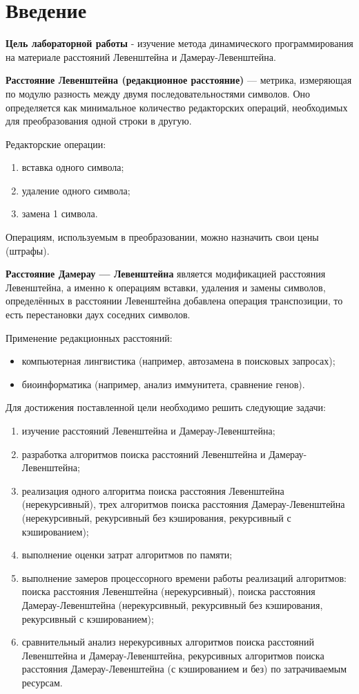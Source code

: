 \chapter*{Введение}
\textbf{Цель лабораторной работы} - изучение метода динамического программирования на материале расстояний Левенштейна и Дамерау-Левенштейна.

\textbf{Расстояние Левенштейна (редакционное расстояние)} — метрика, измеряющая по модулю разность между двумя последовательностями символов. Оно определяется как минимальное количество редакторских операций, необходимых для преобразования одной строки в другую.

Редакторские операции:
\begin{enumerate}[label={\arabic*)}]
    \item вставка одного символа;
    \item удаление одного символа;
    \item замена 1 символа.
\end{enumerate}

Операциям, используемым в преобразовании, можно назначить свои цены (штрафы).

\textbf{Расстояние Дамерау — Левенштейна} является модификацией расстояния Левенштейна, а именно к операциям вставки, удаления и замены символов, определённых в расстоянии Левенштейна добавлена операция транспозиции, то есть перестановки даух соседних символов.

Применение редакционных расстояний:
\begin{itemize}
	\item компьютерная лингвистика (например, автозамена в поисковых запросах);
	\item биоинформатика (например, анализ иммунитета, сравнение генов).
\end{itemize}

Для достижения поставленной цели необходимо решить следующие задачи:
\begin{enumerate}[label={\arabic*)}]
	\item изучение расстояний Левенштейна и Дамерау-Левенштейна;
	\item разработка алгоритмов поиска расстояний Левенштейна и Дамерау-Левенштейна;
	\item реализация одного алгоритма поиска расстояния Левенштейна (нерекурсивный), трех алгоритмов поиска расстояния Дамерау-Левенштейна (нерекурсивный, рекурсивный без кэширования, рекурсивный с кэшированием);
	\item выполнение оценки затрат алгоритмов по памяти;
	\item выполнение замеров процессорного времени работы реализаций алгоритмов:  поиска расстояния Левенштейна (нерекурсивный), поиска расстояния Дамерау-Левенштейна (нерекурсивный, рекурсивный без кэширования, рекурсивный с кэшированием);
	\item сравнительный анализ нерекурсивных алгоритмов поиска расстояний Левенштейна и Дамерау-Левенштейна, рекурсивных алгоритмов поиска расстояния Дамерау-Левенштейна (с кэшированием и без) по затрачиваемым ресурсам.
\end{enumerate}
